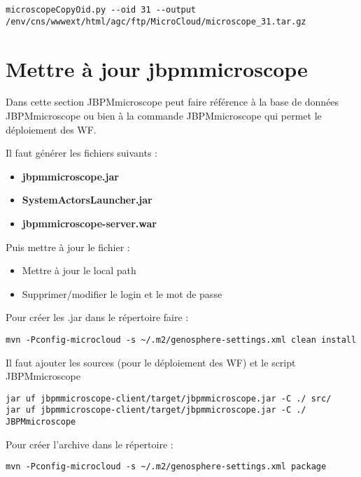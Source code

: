 \begin{lstlisting}[style=bash]
microscopeCopyOid.py --oid 31 --output /env/cns/wwwext/html/agc/ftp/MicroCloud/microscope_31.tar.gz
\end{lstlisting}

\section{Mettre à jour jbpmmicroscope}

Dans cette section JBPMmicroscope peut faire référence à la base de données JBPMmicroscope ou bien à la commande JBPMmicroscope qui permet le déploiement des WF.
\newline

Il faut générer les fichiers suivants :
\begin{itemize}
	\item \textbf{jbpmmicroscope.jar}
	\item \textbf{SystemActorsLauncher.jar}
	\item \textbf{jbpmmicroscope-server.war}
\end{itemize}
\bigskip

Puis mettre à jour le fichier  :
\begin{itemize}
	\item  Mettre à jour le local path
	\item Supprimer/modifier le login et le mot de passe
\end{itemize}

Pour créer les .jar dans le répertoire  faire :

\begin{lstlisting}[style=bash]
mvn -Pconfig-microcloud -s ~/.m2/genosphere-settings.xml clean install
\end{lstlisting}
\bigskip

Il faut ajouter les sources (pour le déploiement des WF) et le script JBPMmicroscope
\begin{lstlisting}[style=bash]
jar uf jbpmmicroscope-client/target/jbpmmicroscope.jar -C ./ src/
jar uf jbpmmicroscope-client/target/jbpmmicroscope.jar -C ./ JBPMmicroscope
\end{lstlisting}
\bigskip

Pour créer l'archive  dans le répertoire  :
\begin{lstlisting}[style=bash]
mvn -Pconfig-microcloud -s ~/.m2/genosphere-settings.xml package
\end{lstlisting}
\bigskip

